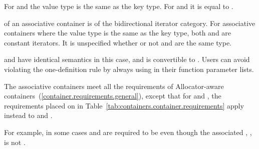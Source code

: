 \pnum
For  and  the value type is the same as the key type.
For  and  it is equal to .

\pnum
{}
of an associative container is of the bidirectional iterator category.
For associative containers where the value type is the same as the key type, both
and
are constant iterators. It is unspecified whether or not
and
are the same type.
\begin{note}  and  have identical semantics in this case, and  is convertible to . Users can avoid violating the one-definition rule by always using  in their function parameter lists. \end{note}

\pnum
The associative containers meet all the requirements of Allocator-aware
containers~(\ref{container.requirements.general}), except that for
 and , the requirements placed on 
in Table~\ref{tab:containers.container.requirements} apply instead to 
and . \begin{note} For example, in some cases  and 
are required to be  even though the associated
, , is not
. \end{note}

